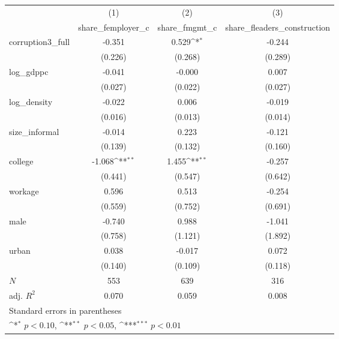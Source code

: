 {
\def\sym#1{\ifmmode^{#1}\else\(^{#1}\)\fi}
\begin{tabular}{l*{3}{c}}
\hline\hline
            &\multicolumn{1}{c}{(1)}&\multicolumn{1}{c}{(2)}&\multicolumn{1}{c}{(3)}\\
            &\multicolumn{1}{c}{share\_femployer\_c}&\multicolumn{1}{c}{share\_fmgmt\_c}&\multicolumn{1}{c}{share\_fleaders\_construction}\\
\hline
corruption3\_full&      -0.351         &       0.529\sym{*}  &      -0.244         \\
            &     (0.226)         &     (0.268)         &     (0.289)         \\
[1em]
log\_gdppc   &      -0.041         &      -0.000         &       0.007         \\
            &     (0.027)         &     (0.022)         &     (0.027)         \\
[1em]
log\_density &      -0.022         &       0.006         &      -0.019         \\
            &     (0.016)         &     (0.013)         &     (0.014)         \\
[1em]
size\_informal&      -0.014         &       0.223         &      -0.121         \\
            &     (0.139)         &     (0.132)         &     (0.160)         \\
[1em]
college     &      -1.068\sym{**} &       1.455\sym{**} &      -0.257         \\
            &     (0.441)         &     (0.547)         &     (0.642)         \\
[1em]
workage     &       0.596         &       0.513         &      -0.254         \\
            &     (0.559)         &     (0.752)         &     (0.691)         \\
[1em]
male        &      -0.740         &       0.988         &      -1.041         \\
            &     (0.758)         &     (1.121)         &     (1.892)         \\
[1em]
urban       &       0.038         &      -0.017         &       0.072         \\
            &     (0.140)         &     (0.109)         &     (0.118)         \\
\hline
\(N\)       &         553         &         639         &         316         \\
adj. \(R^{2}\)&       0.070         &       0.059         &       0.008         \\
\hline\hline
\multicolumn{4}{l}{\footnotesize Standard errors in parentheses}\\
\multicolumn{4}{l}{\footnotesize \sym{*} \(p<0.10\), \sym{**} \(p<0.05\), \sym{***} \(p<0.01\)}\\
\end{tabular}
}
